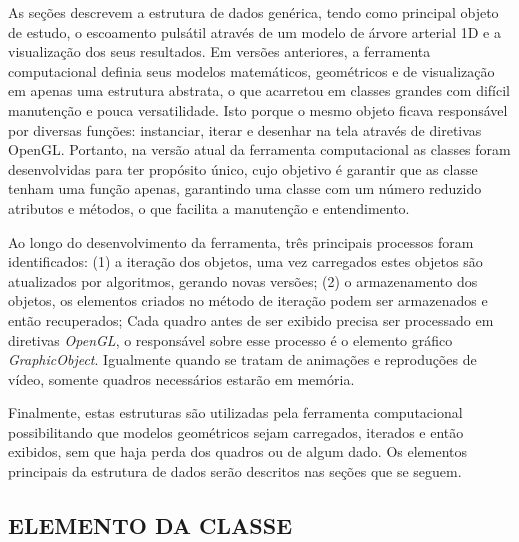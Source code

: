 As seções  descrevem a estrutura de dados genérica, tendo como principal objeto de estudo, o escoamento pulsátil através de um modelo de árvore arterial 1D e a visualização dos seus resultados. Em versões anteriores, a ferramenta computacional definia seus modelos matemáticos, geométricos e de visualização em apenas uma estrutura abstrata, o que acarretou em classes grandes com difícil manutenção e pouca versatilidade. Isto porque o mesmo objeto ficava responsável por diversas funções: instanciar, iterar e desenhar na tela através de diretivas OpenGL. Portanto, na versão atual da ferramenta computacional as classes foram desenvolvidas para ter propósito único, cujo objetivo é garantir que as classe tenham uma função apenas, garantindo uma classe com um número reduzido atributos e métodos, o que facilita a manutenção e entendimento.

Ao longo do desenvolvimento da ferramenta, três principais processos foram identificados: (1) a iteração dos objetos, uma vez carregados estes objetos são atualizados por algoritmos, gerando novas versões; (2) o armazenamento dos objetos, os elementos criados no método de iteração podem ser armazenados e então recuperados;   Cada quadro antes de ser exibido precisa ser processado em diretivas \textit{OpenGL}, o responsável sobre esse processo é o elemento gráfico \textit{GraphicObject}. Igualmente quando se tratam de animações e reproduções de vídeo, somente quadros necessários estarão em memória. 

Finalmente, estas estruturas são utilizadas pela ferramenta computacional possibilitando que modelos geométricos sejam carregados, iterados e então exibidos, sem que haja perda dos quadros ou de algum dado. Os elementos principais da estrutura de dados serão descritos nas seções que se seguem.

\subsection{ELEMENTO DA CLASSE}\label{sec:elemento_inteligente}

